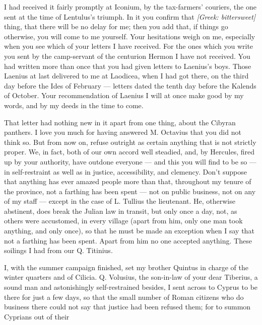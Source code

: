  I had received it fairly promptly at Iconium, by the tax-farmers' couriers, the one sent at the time of Lentulus's triumph. In it you confirm that \textit{[Greek: bittersweet]} thing, that there will be no delay for me; then you add that, if things go otherwise, you will come to me yourself. Your hesitations weigh on me, especially when you see which of your letters I have received. For the ones which you write you sent by the camp-servant of the centurion Hermon I have not received. You had written more than once that you had given letters to Laenius's boys. Those Laenius at last delivered to me at Laodicea, when I had got there, on the third day before the Ides of February --- letters dated the tenth day before the Kalends of October. Your recommendation of Laenius I will at once make good by my words, and by my deeds in the time to come.

 That letter had nothing new in it apart from one thing, about the Cibyran panthers. I love you much for having answered M. Octavius that you did not think so. But from now on, refuse outright as certain anything that is not strictly proper. We, in fact, both of our own accord well steadied, and, by Hercules, fired up by your authority, have outdone everyone --- and this you will find to be so --- in self-restraint as well as in justice, accessibility, and clemency. Don't suppose that anything has ever amazed people more than that, throughout my tenure of the province, not a farthing has been spent --- not on public business, not on any of my staff --- except in the case of L. Tullius the lieutenant. He, otherwise abstinent, does break the Julian law in transit, but only once a day, not, as others were accustomed, in every village (apart from him, only one man took anything, and only once), so that he must be made an exception when I say that not a farthing has been spent. Apart from him no one accepted anything. These soilings I had from our Q. Titinius.

 I, with the summer campaign finished, set my brother Quintus in charge of the winter quarters and of Cilicia. Q. Volusius, the son-in-law of your dear Tiberius, a sound man and astonishingly self-restrained besides, I sent across to Cyprus to be there for just a few days, so that the small number of Roman citizens who do business there could not say that justice had been refused them; for to summon Cyprians out of their

